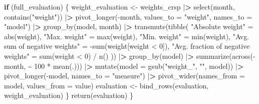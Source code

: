 \documentclass[
]{book}
\newenvironment{Shaded}{\begin{snugshade}}{\end{snugshade}}
\newcommand{\AttributeTok}[1]{\textcolor[rgb]{0.61,0.61,0.61}{#1}}
\newcommand{\ControlFlowTok}[1]{\textcolor[rgb]{0.27,0.27,0.27}{\textbf{#1}}}
\newcommand{\DecValTok}[1]{\textcolor[rgb]{0.06,0.06,0.06}{#1}}
\newcommand{\ErrorTok}[1]{\textcolor[rgb]{0.14,0.14,0.14}{\textbf{#1}}}
\newcommand{\FunctionTok}[1]{\textcolor[rgb]{0,0,0}{#1}}
\newcommand{\NormalTok}[1]{#1}
\newcommand{\OtherTok}[1]{\textcolor[rgb]{0.37,0.37,0.37}{#1}}
\newcommand{\SpecialCharTok}[1]{\textcolor[rgb]{0,0,0}{#1}}
\newcommand{\StringTok}[1]{\textcolor[rgb]{0.5,0.5,0.5}{#1}}
\begin{document}
\begin{Shaded}
\begin{Highlighting}[]
  \ControlFlowTok{if}\NormalTok{ (full\_evaluation) \{}
\NormalTok{    weight\_evaluation }\OtherTok{\textless{}{-}}\NormalTok{ weights\_crsp }\SpecialCharTok{|}\ErrorTok{\textgreater{}}
      \FunctionTok{select}\NormalTok{(month, }\FunctionTok{contains}\NormalTok{(}\StringTok{"weight"}\NormalTok{)) }\SpecialCharTok{|}\ErrorTok{\textgreater{}}
      \FunctionTok{pivot\_longer}\NormalTok{(}\SpecialCharTok{{-}}\NormalTok{month, }\AttributeTok{values\_to =} \StringTok{"weight"}\NormalTok{, }\AttributeTok{names\_to =} \StringTok{"model"}\NormalTok{) }\SpecialCharTok{|}\ErrorTok{\textgreater{}}
      \FunctionTok{group\_by}\NormalTok{(model, month) }\SpecialCharTok{|}\ErrorTok{\textgreater{}}
      \FunctionTok{transmute}\NormalTok{(}\FunctionTok{tibble}\NormalTok{(}
        \StringTok{"Absolute weight"} \OtherTok{=} \FunctionTok{abs}\NormalTok{(weight),}
        \StringTok{"Max. weight"} \OtherTok{=} \FunctionTok{max}\NormalTok{(weight),}
        \StringTok{"Min. weight"} \OtherTok{=} \FunctionTok{min}\NormalTok{(weight),}
        \StringTok{"Avg. sum of negative weights"} \OtherTok{=} \SpecialCharTok{{-}}\FunctionTok{sum}\NormalTok{(weight[weight }\SpecialCharTok{\textless{}} \DecValTok{0}\NormalTok{]),}
        \StringTok{"Avg. fraction of negative weights"} \OtherTok{=} \FunctionTok{sum}\NormalTok{(weight }\SpecialCharTok{\textless{}} \DecValTok{0}\NormalTok{) }\SpecialCharTok{/} \FunctionTok{n}\NormalTok{()}
\NormalTok{      )) }\SpecialCharTok{|}\ErrorTok{\textgreater{}}
      \FunctionTok{group\_by}\NormalTok{(model) }\SpecialCharTok{|}\ErrorTok{\textgreater{}}
      \FunctionTok{summarize}\NormalTok{(}\FunctionTok{across}\NormalTok{(}\SpecialCharTok{{-}}\NormalTok{month, }\SpecialCharTok{\textasciitilde{}} \DecValTok{100} \SpecialCharTok{*} \FunctionTok{mean}\NormalTok{(.))) }\SpecialCharTok{|}\ErrorTok{\textgreater{}}
      \FunctionTok{mutate}\NormalTok{(}\AttributeTok{model =} \FunctionTok{gsub}\NormalTok{(}\StringTok{"weight\_"}\NormalTok{, }\StringTok{""}\NormalTok{, model)) }\SpecialCharTok{|}\ErrorTok{\textgreater{}}
      \FunctionTok{pivot\_longer}\NormalTok{(}\SpecialCharTok{{-}}\NormalTok{model, }\AttributeTok{names\_to =} \StringTok{"measure"}\NormalTok{) }\SpecialCharTok{|}\ErrorTok{\textgreater{}}
      \FunctionTok{pivot\_wider}\NormalTok{(}\AttributeTok{names\_from =}\NormalTok{ model, }\AttributeTok{values\_from =}\NormalTok{ value)}
\NormalTok{    evaluation }\OtherTok{\textless{}{-}} \FunctionTok{bind\_rows}\NormalTok{(evaluation, weight\_evaluation)}
\NormalTok{  \}}
  \FunctionTok{return}\NormalTok{(evaluation)}
\NormalTok{\}}
\end{Highlighting}
\end{Shaded}
\end{document}
